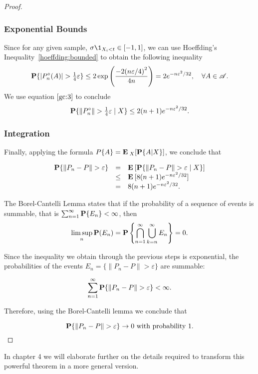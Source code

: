 \begin{proof}
  \subsubsection*{Exponential Bounds}

  Since for any given sample, $\sigma \1_{X_i < t} \in [-1,1]$, we can use Hoeffding's Inequality~\ref{hoeffding:bounded} to obtain the following inequality
  \[ \P \{ |P_n^\circ(A)| > \tfrac{1}{4} \varepsilon \} \leq 2 \exp\left( \frac{-2{(n\varepsilon/4)}^2}{4n}\right) = 2e^{-n\varepsilon^2/32}, \hspace*{1em} \forall A \in \AA.\]
  We use equation $\ref{gc:3}$ to conclude
  \begin{equation} \label{gc:4}
    \P\{ \|P_n^\circ\| > \tfrac{1}{4} \varepsilon \;|\; X\} \leq 2(n+1) e^{-n\varepsilon^2/32}.
  \end{equation} 

  \vspace*{1em}

  \subsubsection*{Integration}

  Finally, applying the formula $P\{A\} = \E_X[\P\{A | X\}]$, we conclude that

  \begin{equation}
    \label{gc:5}\begin{array}{rcl}
      \P \{\|P_n-P\| > \varepsilon\} & = & \E [\P \{\|P_n-P\| > \varepsilon \;|\; X\}]\\
      & \leq & \E [8(n+1) e^{-n\varepsilon^2/32}]\\
      & = & 8(n+1) e^{-n\varepsilon^2/32}.
    \end{array} 
  \end{equation}

  The Borel-Cantelli Lemma states that if the probability of a sequence of events is summable, that is \(\sum_{n = 1}^\infty \P\{E_n\} < \infty\), then
  \begin{equation}\label{borel-cantelli}
    \limsup_n \P(E_n) = \P \left\{ \bigcap_{n=1}^{\infty}\bigcup_{k = n}^{\infty} E_n\right\} = 0.
  \end{equation}

  Since the inequality we obtain through the previous steps is exponential, the probabilities of the events $E_n = \{\|P_n-P\| > \varepsilon\}$ are summable:

  \[  \sum_{n = 1}^\infty \P \{\|P_n-P\| > \varepsilon\} < \infty .\] 

  Therefore, using the Borel-Cantelli lemma we conclude that

  \[ \P \{\|P_n-P\| > \varepsilon\} \to 0 \mbox{ with probability 1.} \] 
\end{proof}

In chapter 4 we will elaborate further on the details required to transform this powerful theorem in a more general version.

